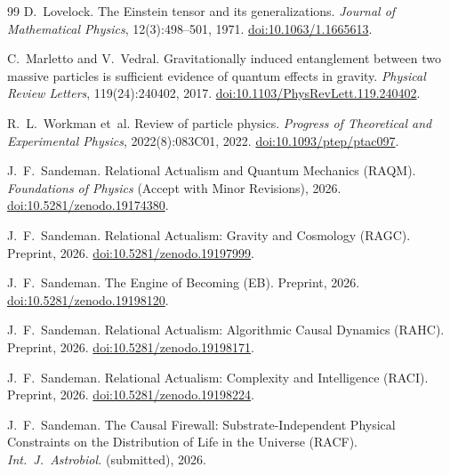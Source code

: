 \documentclass[11pt,a4paper]{article}
\begin{document}
\begin{thebibliography}{99}
D.~Lovelock.
\newblock The Einstein tensor and its generalizations.
\newblock \emph{Journal of Mathematical Physics}, 12(3):498--501, 1971.
\newblock \href{https://doi.org/10.1063/1.1665613}{doi:10.1063/1.1665613}.

C.~Marletto and V.~Vedral.
\newblock Gravitationally induced entanglement between two massive particles
  is sufficient evidence of quantum effects in gravity.
\newblock \emph{Physical Review Letters}, 119(24):240402, 2017.
\newblock \href{https://doi.org/10.1103/PhysRevLett.119.240402}%
  {doi:10.1103/PhysRevLett.119.240402}.

R.~L.~Workman et~al.
\newblock Review of particle physics.
\newblock \emph{Progress of Theoretical and Experimental Physics},
  2022(8):083C01, 2022.
\newblock \href{https://doi.org/10.1093/ptep/ptac097}{doi:10.1093/ptep/ptac097}.

J.~F.~Sandeman.
\newblock Relational Actualism and Quantum Mechanics (RAQM).
\newblock \emph{Foundations of Physics} (Accept with Minor Revisions), 2026.
\newblock \href{https://doi.org/10.5281/zenodo.19174380}%
  {doi:10.5281/zenodo.19174380}.

J.~F.~Sandeman.
\newblock Relational Actualism: Gravity and Cosmology (RAGC).
\newblock Preprint, 2026.
\newblock \href{https://doi.org/10.5281/zenodo.19197999}%
  {doi:10.5281/zenodo.19197999}.

J.~F.~Sandeman.
\newblock The Engine of Becoming (EB).
\newblock Preprint, 2026.
\newblock \href{https://doi.org/10.5281/zenodo.19198120}%
  {doi:10.5281/zenodo.19198120}.

J.~F.~Sandeman.
\newblock Relational Actualism: Algorithmic Causal Dynamics (RAHC).
\newblock Preprint, 2026.
\newblock \href{https://doi.org/10.5281/zenodo.19198171}%
  {doi:10.5281/zenodo.19198171}.

J.~F.~Sandeman.
\newblock Relational Actualism: Complexity and Intelligence (RACI).
\newblock Preprint, 2026.
\newblock \href{https://doi.org/10.5281/zenodo.19198224}%
  {doi:10.5281/zenodo.19198224}.

J.~F.~Sandeman.
\newblock The Causal Firewall: Substrate-Independent Physical Constraints
  on the Distribution of Life in the Universe (RACF).
\newblock \textit{Int.\ J.\ Astrobiol.} (submitted), 2026.


\end{thebibliography}
\end{document}
